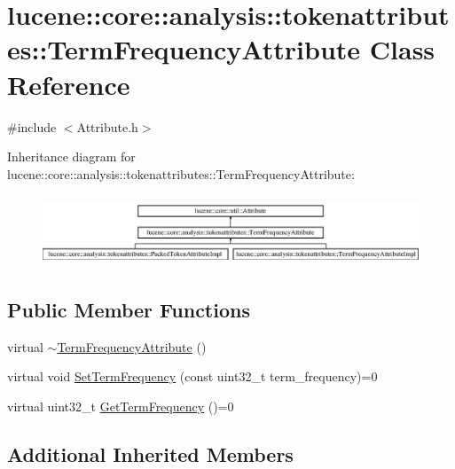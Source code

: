 \hypertarget{classlucene_1_1core_1_1analysis_1_1tokenattributes_1_1TermFrequencyAttribute}{}\section{lucene\+:\+:core\+:\+:analysis\+:\+:tokenattributes\+:\+:Term\+Frequency\+Attribute Class Reference}
\label{classlucene_1_1core_1_1analysis_1_1tokenattributes_1_1TermFrequencyAttribute}


{\ttfamily \#include $<$Attribute.\+h$>$}

Inheritance diagram for lucene\+:\+:core\+:\+:analysis\+:\+:tokenattributes\+:\+:Term\+Frequency\+Attribute\+:\begin{figure}[H]
\begin{center}
\leavevmode
\includegraphics[height=2.137405cm]{classlucene_1_1core_1_1analysis_1_1tokenattributes_1_1TermFrequencyAttribute}
\end{center}
\end{figure}
\subsection*{Public Member Functions}
\begin{DoxyCompactItemize}
\item 
virtual \mbox{\hyperlink{classlucene_1_1core_1_1analysis_1_1tokenattributes_1_1TermFrequencyAttribute_aeb43d01255010bab6bcbf05e74d87d7e}{$\sim$\+Term\+Frequency\+Attribute}} ()
\item 
virtual void \mbox{\hyperlink{classlucene_1_1core_1_1analysis_1_1tokenattributes_1_1TermFrequencyAttribute_aeb8ef8cc3f3ab6c8678b491ac3e1b682}{Set\+Term\+Frequency}} (const uint32\+\_\+t term\+\_\+frequency)=0
\item 
virtual uint32\+\_\+t \mbox{\hyperlink{classlucene_1_1core_1_1analysis_1_1tokenattributes_1_1TermFrequencyAttribute_a2ddffa369215ac61e2eadbab087f5d74}{Get\+Term\+Frequency}} ()=0
\end{DoxyCompactItemize}
\subsection*{Additional Inherited Members}


